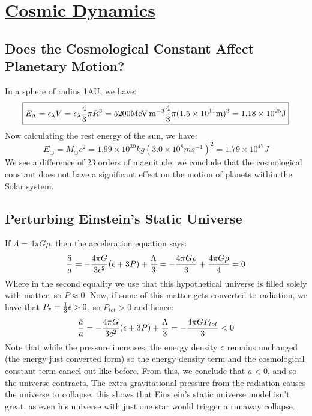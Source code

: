 \section[Cosmic Dynamics]{\hyperlink{toc}{Cosmic Dynamics}}

\subsection{Does the Cosmological Constant Affect Planetary Motion?}
In a sphere of radius 1AU, we have:
\begin{equation}
    \boxed{E_{\Lambda} = \e_{\lambda}V = \e_{\lambda}\frac{4}{3}\pi R^3 = 5200 \si{MeV.m^{-3}} \frac{4}{3}\pi (1.5 \times 10^{11}\si{m})^3 = 1.18 \times 10^{25} \si{J}}
\end{equation}
Now calculating the rest energy of the sun, we have:
\begin{equation}
    \boxed{E_{\odot} = M_{\odot}c^2 = 1.99 \times 10^{30}\si{kg} (3.0 \times 10^{8}\si{ms^{-1}})^2 = 1.79 \times 10^{47}\si{J}}
\end{equation}
We see a difference of 23 orders of magnitude; we conclude that the cosmological constant does not have a significant effect on the motion of planets within the Solar system.

\subsection{Perturbing Einstein's Static Universe}
If $\Lambda = 4\pi G \rho$, then the acceleration equation says:
\begin{equation}
    \frac{\ddot{a}}{a} = -\frac{4\pi G}{3c^2}(\e + 3P) + \frac{\Lambda}{3} = -\frac{4\pi G\rho}{3} + \frac{4\pi G \rho}{4} = 0
\end{equation}
Where in the second equality we use that this hypothetical universe is filled solely with matter, so $P \approx 0$. Now, if some of this matter gets converted to radiation, we have that $P_{r} = \frac{1}{3}\e > 0$, so $P_{tot} > 0$ and hence:
\begin{equation}
    \frac{\ddot{a}}{a} = -\frac{4\pi G}{3c^2}(\e + 3P) + \frac{\Lambda}{3} = -\frac{4\pi G P_{tot}}{3} < 0
\end{equation} 
Note that while the pressure increases, the energy density $\e$ remains unchanged (the energy just converted form) so the energy density term and the cosmological constant term cancel out like before. From this, we conclude that $\ddot{a} < 0$, and so $\boxed{\text{the universe contracts}}$. The extra gravitational pressure from the radiation causes the universe to collapse; this shows that Einstein's static universe model isn't great, as even his universe with just one star would trigger a runaway collapse.

